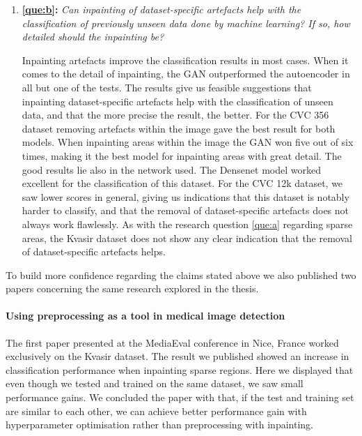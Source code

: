 \begin{enumerate}
\item \textbf{\ref{que:b}:} \textit{ Can inpainting of dataset-specific artefacts help with the classification of previously unseen data done by machine learning? If so, how detailed should the inpainting be?}
    
    
Inpainting artefacts improve the classification results in most cases. When it comes to the detail of inpainting, the GAN outperformed the autoencoder in all but one of the tests. The results give us feasible suggestions that inpainting dataset-specific artefacts help with the classification of unseen data, and that the more precise the result, the better.
For the CVC 356 dataset removing artefacts within the image gave the best result for both models. When inpainting areas within the image the GAN won five out of six times, making it the best model for inpainting areas with great detail. The good results lie also in the network used. The Densenet model worked excellent for the classification of this dataset.
For the CVC 12k dataset, we saw lower scores in general, giving us indications that this dataset is notably harder to classify, and that the removal of dataset-specific artefacts does not always work flawlessly. 
As with the research question \ref{que:a} regarding sparse areas, the Kvasir dataset does not show any clear indication that the removal of dataset-specific artefacts helps.

\end{enumerate}


\noindent
To build more confidence regarding the claims stated above we also published two papers concerning the same research explored in the thesis.

\paragraph{Using preprocessing as a tool in medical image detection~\cite{Mathias2018MediaevalPaper}}
The first paper presented at the MediaEval conference in Nice, France worked exclusively on the Kvasir dataset. The result we published showed an increase in classification performance when inpainting sparse regions. 
Here we displayed that even though we tested and trained on the same dataset, we saw small performance gains. We concluded the paper with that, if the test and training set are similar to each other, we can achieve better performance gain with hyperparameter optimisation rather than preprocessing with inpainting. 


